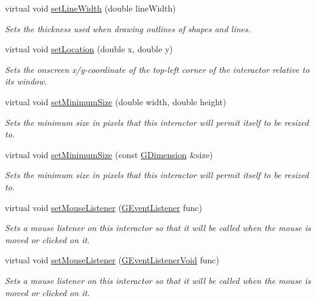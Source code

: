 \begin{DoxyCompactItemize}
virtual void \mbox{\hyperlink{classsgl_1_1GDrawingSurface_afd6a47c6ea6a1f85ca05a65ba3ff3477}{set\+Line\+Width}} (double line\+Width)
\begin{DoxyCompactList}\small\item\em Sets the thickness used when drawing outlines of shapes and lines. \end{DoxyCompactList}\item 
virtual void \mbox{\hyperlink{classsgl_1_1GInteractor_a04594e8ba9b98513a64f1da00dcae18c}{set\+Location}} (double x, double y)
\begin{DoxyCompactList}\small\item\em Sets the onscreen x/y-\/coordinate of the top-\/left corner of the interactor relative to its window. \end{DoxyCompactList}\item 
virtual void \mbox{\hyperlink{classsgl_1_1GInteractor_a0cf428e207b7f22cc08138a90b1b87b2}{set\+Minimum\+Size}} (double width, double height)
\begin{DoxyCompactList}\small\item\em Sets the minimum size in pixels that this interactor will permit itself to be resized to. \end{DoxyCompactList}\item 
virtual void \mbox{\hyperlink{classsgl_1_1GInteractor_a3b1046117ac6cb7abe467e00ba8a81f4}{set\+Minimum\+Size}} (const \mbox{\hyperlink{structsgl_1_1GDimension}{G\+Dimension}} \&size)
\begin{DoxyCompactList}\small\item\em Sets the minimum size in pixels that this interactor will permit itself to be resized to. \end{DoxyCompactList}\item 
virtual void \mbox{\hyperlink{classsgl_1_1GInteractor_a37d8dbc943f59920f705b0104f60bde2}{set\+Mouse\+Listener}} (\mbox{\hyperlink{namespacesgl_ae9f3e9eab70035da1a2b114e21357b25}{G\+Event\+Listener}} func)
\begin{DoxyCompactList}\small\item\em Sets a mouse listener on this interactor so that it will be called when the mouse is moved or clicked on it. \end{DoxyCompactList}\item 
virtual void \mbox{\hyperlink{classsgl_1_1GInteractor_aea7f647ea62d59f71b5fad6aa65eeaf9}{set\+Mouse\+Listener}} (\mbox{\hyperlink{namespacesgl_a54427ce97bb1c2804e4fe2b0a62e8b17}{G\+Event\+Listener\+Void}} func)
\begin{DoxyCompactList}\small\item\em Sets a mouse listener on this interactor so that it will be called when the mouse is moved or clicked on it. \end{DoxyCompactList}\item 

\end{DoxyCompactItemize}
